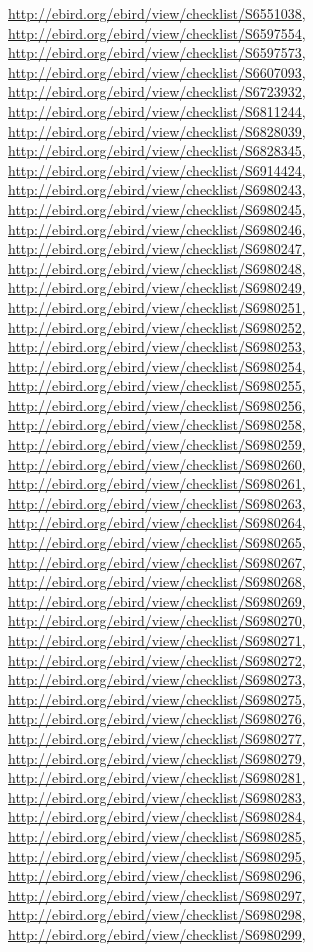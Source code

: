 \documentclass[9pt, article]{memoir}
\begin{document}
\begin{multicols}{2}
\url{http://ebird.org/ebird/view/checklist/S6551038}, 
\url{http://ebird.org/ebird/view/checklist/S6597554}, 
\url{http://ebird.org/ebird/view/checklist/S6597573}, 
\url{http://ebird.org/ebird/view/checklist/S6607093}, 
\url{http://ebird.org/ebird/view/checklist/S6723932}, 
\url{http://ebird.org/ebird/view/checklist/S6811244}, 
\url{http://ebird.org/ebird/view/checklist/S6828039}, 
\url{http://ebird.org/ebird/view/checklist/S6828345}, 
\url{http://ebird.org/ebird/view/checklist/S6914424}, 
\url{http://ebird.org/ebird/view/checklist/S6980243}, 
\url{http://ebird.org/ebird/view/checklist/S6980245}, 
\url{http://ebird.org/ebird/view/checklist/S6980246}, 
\url{http://ebird.org/ebird/view/checklist/S6980247}, 
\url{http://ebird.org/ebird/view/checklist/S6980248}, 
\url{http://ebird.org/ebird/view/checklist/S6980249}, 
\url{http://ebird.org/ebird/view/checklist/S6980251}, 
\url{http://ebird.org/ebird/view/checklist/S6980252}, 
\url{http://ebird.org/ebird/view/checklist/S6980253}, 
\url{http://ebird.org/ebird/view/checklist/S6980254}, 
\url{http://ebird.org/ebird/view/checklist/S6980255}, 
\url{http://ebird.org/ebird/view/checklist/S6980256}, 
\url{http://ebird.org/ebird/view/checklist/S6980258}, 
\url{http://ebird.org/ebird/view/checklist/S6980259}, 
\url{http://ebird.org/ebird/view/checklist/S6980260}, 
\url{http://ebird.org/ebird/view/checklist/S6980261}, 
\url{http://ebird.org/ebird/view/checklist/S6980263}, 
\url{http://ebird.org/ebird/view/checklist/S6980264}, 
\url{http://ebird.org/ebird/view/checklist/S6980265}, 
\url{http://ebird.org/ebird/view/checklist/S6980267}, 
\url{http://ebird.org/ebird/view/checklist/S6980268}, 
\url{http://ebird.org/ebird/view/checklist/S6980269}, 
\url{http://ebird.org/ebird/view/checklist/S6980270}, 
\url{http://ebird.org/ebird/view/checklist/S6980271}, 
\url{http://ebird.org/ebird/view/checklist/S6980272}, 
\url{http://ebird.org/ebird/view/checklist/S6980273}, 
\url{http://ebird.org/ebird/view/checklist/S6980275}, 
\url{http://ebird.org/ebird/view/checklist/S6980276}, 
\url{http://ebird.org/ebird/view/checklist/S6980277}, 
\url{http://ebird.org/ebird/view/checklist/S6980279}, 
\url{http://ebird.org/ebird/view/checklist/S6980281}, 
\url{http://ebird.org/ebird/view/checklist/S6980283}, 
\url{http://ebird.org/ebird/view/checklist/S6980284}, 
\url{http://ebird.org/ebird/view/checklist/S6980285}, 
\url{http://ebird.org/ebird/view/checklist/S6980295}, 
\url{http://ebird.org/ebird/view/checklist/S6980296}, 
\url{http://ebird.org/ebird/view/checklist/S6980297}, 
\url{http://ebird.org/ebird/view/checklist/S6980298}, 
\url{http://ebird.org/ebird/view/checklist/S6980299}, 

\end{multicols}
\end{document}
